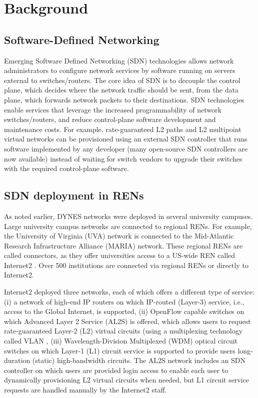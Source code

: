 \section{Background}
\label{sec:intro-background}

\subsection{Software-Defined Networking}
Emerging Software Defined Networking (SDN) \cite{SDNs} technologies allows network administrators to configure network services by software running on servers external to switches/routers. The core idea of SDN is to decouple the control plane, which decides where the network traffic should be sent, from the data plane, which forwards network packets to their destinations. SDN technologies enable services that leverage the increased programmability of
network switches/routers, and reduce control-plane software development and maintenance costs. For example, rate-guaranteed L2 paths and L2 multipoint virtual networks can be provisioned using an 
external SDN controller that runs software
implemented by any developer (many open-source SDN controllers are now available) instead of waiting for switch vendors to upgrade their switches with the required control-plane software.

\subsection{SDN deployment in RENs}
As noted earlier, DYNES networks were deployed in several university campuses. Large university campus networks
are connected to regional RENs. For example, the University of Virginia (UVA) network is connected to the Mid-Atlantic Research Infrastructure Alliance (MARIA) network. These regional RENs are called connectors,
as they offer universities access to a US-wide REN called 
Internet2 \cite{Internet2}. Over 500 institutions are connected via regional RENs or directly to Internet2. 

Internet2 deployed three networks, each of which offers a different type of service: (i) a network of high-end IP routers on which IP-routed (Layer-3) service, i.e., access to the Global Internet, is supported, (ii) OpenFlow capable switches on which Advanced Layer 2 Service (AL2S) \cite{AL2S} is offered, which allows users to request rate-guaranteed Layer-2 (L2) virtual circuits (using a multiplexing technology called VLAN \cite{VLAN}, (iii) Wavelength-Division Multiplexed (WDM) optical circuit switches on which Layer-1 (L1) circuit service is supported to provide users long-duration (static) high-bandwidth circuits. The AL2S network includes an SDN controller on which users are provided login access to enable each user to dynamically provisioning
L2 virtual circuits when needed, but L1 circuit service requests are handled manually by the Internet2 staff.



